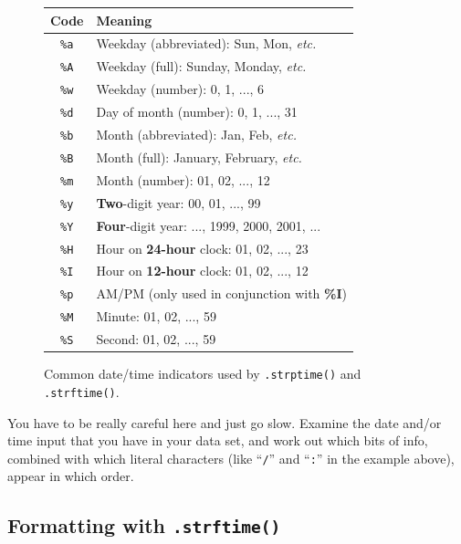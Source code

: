 \begin{figure}[ht]
\centering
{}   %
\begin{tabular}{|c|l|}
\hline
\textbf{Code} & \textbf{Meaning} \\
\hline
\texttt{\%a} & Weekday (abbreviated): Sun, Mon, \textit{etc.} \\
\texttt{\%A} & Weekday (full): Sunday, Monday, \textit{etc.} \\
\texttt{\%w} & Weekday (number): 0, 1, ..., 6 \\
\texttt{\%d} & Day of month (number): 0, 1, ..., 31 \\
\texttt{\%b} & Month (abbreviated): Jan, Feb, \textit{etc.} \\
\texttt{\%B} & Month (full): January, February, \textit{etc.} \\
\texttt{\%m} & Month (number): 01, 02, ..., 12 \\
\texttt{\%y} & \textbf{Two}-digit year: 00, 01, ..., 99 \\
\texttt{\%Y} & \textbf{Four}-digit year: ..., 1999, 2000, 2001, ...\\
\hline
\texttt{\%H} & Hour on \textbf{24-hour} clock: 01, 02, ..., 23 \\
\texttt{\%I} & Hour on \textbf{12-hour} clock: 01, 02, ..., 12 \\
\texttt{\%p} & AM/PM (only used in conjunction with \textbf{\%I}) \\
\texttt{\%M} & Minute: 01, 02, ..., 59 \\
\texttt{\%S} & Second: 01, 02, ..., 59 \\
\hline
\end{tabular}
\medskip
\caption{Common date/time indicators used by \texttt{.strptime()} and
\texttt{.strftime()}.}
\label{datetimeids}
\end{figure}

You have to be really careful here and just go slow. Examine the date and/or
time input that you have in your data set, and work out which bits of info,
combined with which literal characters (like ``\texttt{/}'' and ``\texttt{:}''
in the example above), appear in which order.

\subsection{Formatting with \texttt{.strftime()}}


